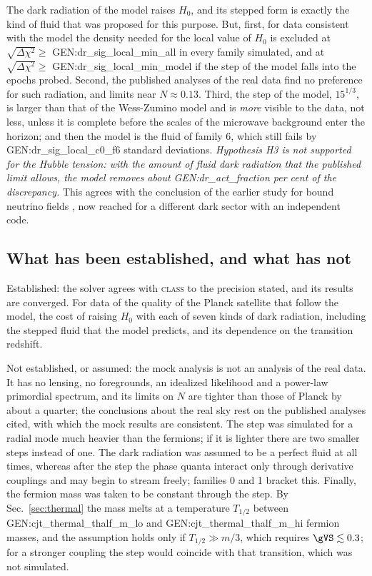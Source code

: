 The dark radiation of the model raises $H_0$, and its stepped form is exactly the kind of fluid that
was proposed for this purpose. But, first, for data consistent with the \LCDM{} model the density
needed for the local value of $H_0$ is excluded at $\sqrt{\Delta\chi^2}\ge$
{{GEN:dr_sig_local_min_all}} in every family simulated, and at $\sqrt{\Delta\chi^2}\ge$
{{GEN:dr_sig_local_min_model}} if the step of the model falls into the epochs probed. Second, the
published analyses of the real data find no preference for such radiation, and limits near
$N\approx0.13$. Third, the step of the model, $15^{1/3}$, is larger than that of the Wess-Zumino
model and is \emph{more} visible to the data, not less, unless it is complete before the scales of
the microwave background enter the horizon; and then the model is the fluid of family 6, which still
fails by {{GEN:dr_sig_local_c0_f6}} standard deviations. \emph{Hypothesis H3 is not supported for the
Hubble tension: with the amount of fluid dark radiation that the published limit allows, the model
removes about {{GEN:dr_act_fraction}} per cent of the discrepancy.} This agrees with the conclusion
of the earlier study for bound neutrino fields \cite{NashNCSS}, now reached for a different dark
sector with an independent code.

\subsection{What has been established, and what has not}

Established: the solver agrees with \textsc{class} to the precision stated, and its results are
converged. For data of the quality of the Planck satellite that follow the \LCDM{} model, the cost of
raising $H_0$ with each of seven kinds of dark radiation, including the stepped fluid that the model
predicts, and its dependence on the transition redshift.

Not established, or assumed: the mock analysis is not an analysis of the real data. It has no
lensing, no foregrounds, an idealized likelihood and a power-law primordial spectrum, and its limits
on $N$ are tighter than those of Planck by about a quarter; the conclusions about the real sky rest
on the published analyses cited, with which the mock results are consistent. The step was simulated
for a radial mode much heavier than the fermions; if it is lighter there are two smaller steps
instead of one. The dark radiation was assumed to be a perfect fluid at all times, whereas after the
step the phase quanta interact only through derivative couplings and may begin to stream freely;
families 0 and 1 bracket this. Finally, the fermion mass was taken to be constant through the step.
By Sec.~\ref{sec:thermal} the mass melts at a temperature $T_{1/2}$ between
{{GEN:cjt_thermal_thalf_m_lo}} and {{GEN:cjt_thermal_thalf_m_hi}} fermion masses, and the assumption
holds only if $T_{1/2}\gg m/3$, which requires $\gVS\lesssim0.3$; for a stronger coupling the step
would coincide with that transition, which was not simulated.
